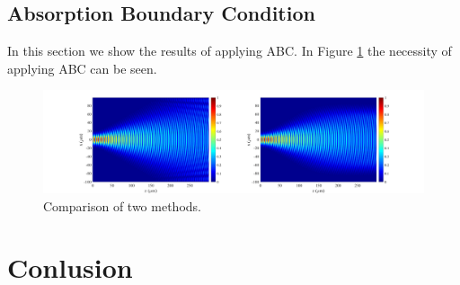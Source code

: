 \documentclass{article}
\begin{document}
	\subsection{Absorption Boundary Condition}
	In this section we show the results of applying ABC. In Figure \ref{fig:Absorption2} the necessity of applying ABC can be seen.
	
	\begin{figure}[h!]
		\hspace{-30mm}
		\includegraphics[width=1.5\textwidth]{N3.jpg}
		\caption{\label{fig:Absorption2}Comparison of two methods.}
	\end{figure}
	\newpage
	\section{Conlusion}
	
\end{document}
